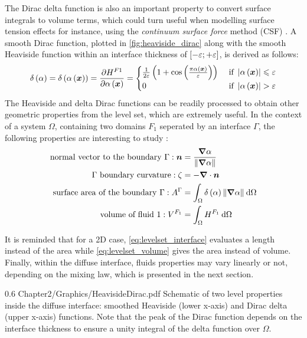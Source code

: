 The Dirac delta function is also an important property to convert surface integrals to volume terms, which could
turn useful when modelling surface tension effects for instance, using 
the \emph{continuum surface force} method (CSF) \citep{brackbill_continuum_1992}.
A smooth Dirac function, plotted in \cref{fig:heaviside_dirac} along with the smooth Heaviside function within an interface thickness 
of $\left[ -\varepsilon;+\varepsilon \right]$, is derived as follows:
\begin{align}
\label{eq:dirac}
\delta \left( \alpha \right) = \delta \left( \alpha \left( \boldsymbol{x} \right) \right) = \frac{\partial H^{F1}  }{\partial \alpha \left( \boldsymbol{x} \right)}=
\begin{cases}
\frac{1}{2\varepsilon} \left(  1 + \cos \left( \frac{\pi \alpha \left( \boldsymbol{x} \right)}{\varepsilon } \right)  \right)  & \text{ if } \left | \alpha \left( \boldsymbol{x} \right) \right | \leqslant  \varepsilon \\
    0  & \text{ if } \left | \alpha \left( \boldsymbol{x} \right) \right | > \varepsilon
\end{cases}
\end{align}
The Heaviside and delta Dirac functions can be readily processed to obtain other geometric properties from the level set,
which are extremely useful. In the context of a system $\Omega$, containing two domains $F_1$ seperated by an interface $\Gamma$, 
the following properties are interesting to study \citep{peng_pde-based_1999}:
\begin{align}
\label{eq:levelset_normal}
\text{normal vector to the boundary }\Gamma: \vec{n} &= \frac{\nabvec \levelset}{\norm{\nabvec \levelset} } \\
%
\label{eq:levelset_curvature}
\Gamma \text{ boundary curvature}: \zeta &= - \nabvec \cdot \vec{n} \\
%
\label{eq:levelset_interface}
\text{surface area of the boundary }\Gamma: A^\Gamma &= \integral{\Omega}{\dirac \norm{\nabvec \levelset}}{\Omega} \\
%
\label{eq:levelset_volume}
\text{volume of fluid 1}: V^{F_1} &= \integral{\Omega}{\heaviside^{F_1}}{\Omega}
%
\end{align}

It is reminded that for a 2D case, \cref{eq:levelset_interface} evaluates a length 
instead of the area while \cref{eq:levelset_volume} gives the area instead of volume.
Finally, within the diffuse interface, fluids properties 
may vary linearly or not, depending on the mixing law, which is presented in the next section.
\begin{figureth}
{0.6}
{Chapter2/Graphics/HeavisideDirac.pdf}
{Schematic of two level properties inside the diffuse interface: smoothed Heaviside (lower x-axis) and Dirac delta (upper x-axis) functions.
Note that the peak of the Dirac function depends on the interface thickness to ensure a unity integral of the delta function over $\Omega$. }
\label{fig:heaviside_dirac}
\end{figureth}

